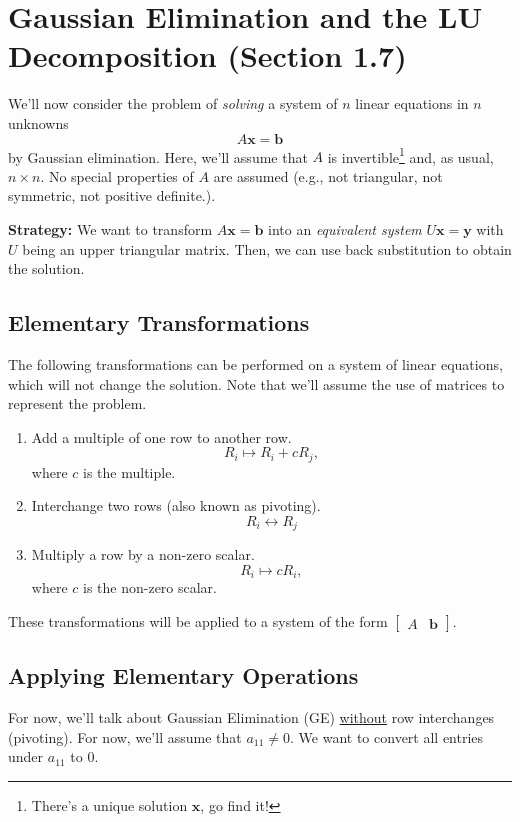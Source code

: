 \documentclass[letterpaper]{article}
\newcommand{\0}{\mathbf{0}}
\newcommand{\y}{\mathbf{y}}
\renewcommand{\b}{\mathbf{b}}
\newcommand{\x}{\mathbf{x}}
\begin{document}
\section{Gaussian Elimination and the LU Decomposition (Section 1.7)}
We'll now consider the problem of \emph{solving} a system of $n$ linear equations in $n$ unknowns \[A\x = \b\] by Gaussian elimination. Here, we'll assume that $A$ is invertible\footnote{There's a unique solution $\x$, go find it!} and, as usual, $n \times n$. No special properties of $A$ are assumed (e.g., not triangular, not symmetric, not positive definite.).

\begin{mdframed}
    \textbf{Strategy:} We want to transform $A\x = \b$ into an \emph{equivalent system} $U\x = \y$ with $U$ being an upper triangular matrix. Then, we can use back substitution to obtain the solution.
\end{mdframed}

\subsection{Elementary Transformations}
The following transformations can be performed on a system of linear equations, which will not change the solution. Note that we'll assume the use of matrices to represent the problem. 
\begin{enumerate}
    \item Add a multiple of one row to another row.
    \[R_i \mapsto R_i + cR_j,\]
    where $c$ is the multiple. 

    \item Interchange two rows (also known as pivoting). 
    \[R_i \leftrightarrow R_j\]

    \item Multiply a row by a non-zero scalar. 
    \[R_i \mapsto cR_i,\]
    where $c$ is the non-zero scalar.
\end{enumerate}
These transformations will be applied to a system of the form $\begin{bmatrix}
    A & \b
\end{bmatrix}$. 

\subsection{Applying Elementary Operations}
For now, we'll talk about Gaussian Elimination (GE) \underline{without} row interchanges (pivoting). For now, we'll assume that $a_{11} \neq 0$. We want to convert all entries under $a_{11}$ to 0. 
\end{document}
